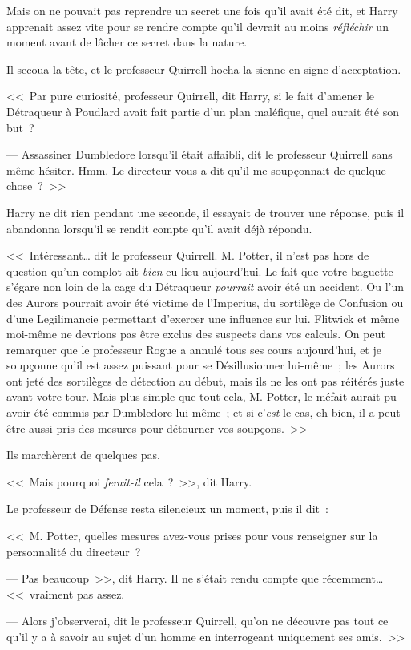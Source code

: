 Mais on ne pouvait pas reprendre un secret une fois qu'il avait été dit, et Harry apprenait assez vite pour se rendre compte qu'il devrait au moins \emph{réfléchir} un moment avant de lâcher ce secret dans la nature.

Il secoua la tête, et le professeur Quirrell hocha la sienne en signe d'acceptation.

<<~Par pure curiosité, professeur Quirrell, dit Harry, si le fait d'amener le Détraqueur à Poudlard avait fait partie d'un plan maléfique, quel aurait été son but~?

--- Assassiner Dumbledore lorsqu'il était affaibli, dit le professeur Quirrell sans même hésiter. Hmm. Le directeur vous a dit qu'il me soupçonnait de quelque chose~?~>>

Harry ne dit rien pendant une seconde, il essayait de trouver une réponse, puis il abandonna lorsqu'il se rendit compte qu'il avait déjà répondu.

<<~Intéressant… dit le professeur Quirrell. M. Potter, il n'est pas hors de question qu'un complot ait \emph{bien} eu lieu aujourd'hui. Le fait que votre baguette s'égare non loin de la cage du Détraqueur \emph{pourrait} avoir été un accident. Ou l'un des Aurors pourrait avoir été victime de l'Imperius, du sortilège de Confusion ou d'une Legilimancie permettant d'exercer une influence sur lui. Flitwick et même moi-même ne devrions pas être exclus des suspects dans vos calculs. On peut remarquer que le professeur Rogue a annulé tous ses cours aujourd'hui, et je soupçonne qu'il est assez puissant pour se Désillusionner lui-même~; les Aurors ont jeté des sortilèges de détection au début, mais ils ne les ont pas réitérés juste avant votre tour. Mais plus simple que tout cela, M. Potter, le méfait aurait pu avoir été commis par Dumbledore lui-même~; et si c'\emph{est} le cas, eh bien, il a peut-être aussi pris des mesures pour détourner vos soupçons.~>>

Ils marchèrent de quelques pas.

<<~Mais pourquoi \emph{ferait-il} cela~?~>>, dit Harry.

Le professeur de Défense resta silencieux un moment, puis il dit~:

<<~M. Potter, quelles mesures avez-vous prises pour vous renseigner sur la personnalité du directeur~?

--- Pas beaucoup~>>, dit Harry. Il ne s'était rendu compte que récemment… <<~vraiment pas assez.

--- Alors j'observerai, dit le professeur Quirrell, qu'on ne découvre pas tout ce qu'il y a à savoir au sujet d'un homme en interrogeant uniquement ses amis.~>>

